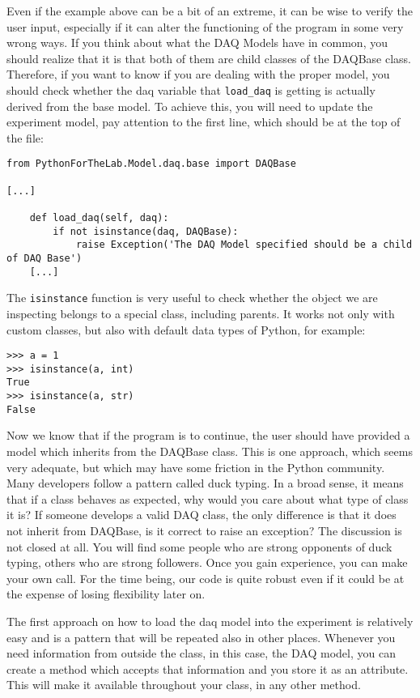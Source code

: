 Even if the example above can be a bit of an extreme, it can be wise to verify the user input, especially if it can alter the functioning of the program in some very wrong ways. If you think about what the {DAQ} Models have in common, you should realize that it is that both of them are child classes of the DAQBase class. Therefore, if you want to know if you are dealing with the proper model, you should check whether the daq variable that \texttt{load_daq} is getting is actually derived from the base model. To achieve this, you will need to update the experiment model, pay attention to the first line, which should be at the top of the file:

\begin{verbatim}
from PythonForTheLab.Model.daq.base import DAQBase

[...]

    def load_daq(self, daq):
        if not isinstance(daq, DAQBase):
            raise Exception('The DAQ Model specified should be a child of DAQ Base')
    [...]
\end{verbatim}

The \texttt{isinstance} function is very useful to check whether the object we are inspecting belongs to a special class, including parents. It works not only with custom classes, but also with default data types of Python, for example:

\begin{verbatim}
>>> a = 1
>>> isinstance(a, int)
True
>>> isinstance(a, str)
False
\end{verbatim}

Now we know that if the program is to continue, the user should have provided a model which inherits from the DAQBase class. This is one approach, which seems very adequate, but which may have some friction in the Python community. Many developers follow a pattern called duck typing. In a broad sense, it means that if a class behaves as expected, why would you care about what type of class it is? If someone develops a valid DAQ class, the only difference is that it does not inherit from DAQBase, is it correct to raise an exception? The discussion is not closed at all. You will find some people who are strong opponents of duck typing, others who are strong followers. Once you gain experience, you can make your own call. For the time being, our code is quite robust even if it could be at the expense of losing flexibility later on. 

The first approach on how to load the daq model into the experiment is relatively easy and is a pattern that will be repeated also in other places. Whenever you need information from outside the class, in this case, the DAQ model, you can create a method which accepts that information and you store it as an attribute. This will make it available throughout your class, in any other method. 

